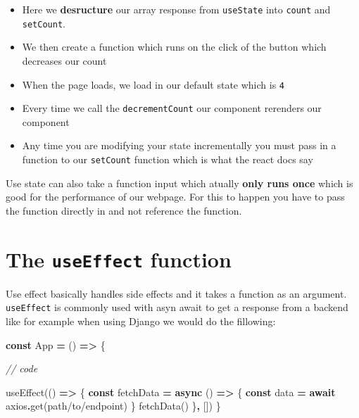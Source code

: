 \documentclass[
]{report}
\newenvironment{Shaded}{\begin{snugshade}}{\end{snugshade}}
\newcommand{\CommentTok}[1]{\textcolor[rgb]{0.56,0.35,0.01}{\textit{#1}}}
\newcommand{\ControlFlowTok}[1]{\textcolor[rgb]{0.13,0.29,0.53}{\textbf{#1}}}
\newcommand{\FunctionTok}[1]{\textcolor[rgb]{0.00,0.00,0.00}{#1}}
\newcommand{\KeywordTok}[1]{\textcolor[rgb]{0.13,0.29,0.53}{\textbf{#1}}}
\newcommand{\NormalTok}[1]{#1}
\newcommand{\OperatorTok}[1]{\textcolor[rgb]{0.81,0.36,0.00}{\textbf{#1}}}
\newcommand{\StringTok}[1]{\textcolor[rgb]{0.31,0.60,0.02}{#1}}
\providecommand{\tightlist}{%
  \setlength{\itemsep}{0pt}\setlength{\parskip}{0pt}}
\theoremstyle{definition}
\theoremstyle{definition}
\theoremstyle{definition}
\theoremstyle{definition}
\theoremstyle{remark}
\begin{document}
\begin{itemize}
\tightlist
\item
  Here we \textbf{desructure} our array response from \texttt{useState} into \texttt{count} and
  \texttt{setCount}.
\item
  We then create a function which runs on the click of the button which
  decreases our count
\item
  When the page loads, we load in our default state which is \texttt{4}
\item
  Every time we call the \texttt{decrementCount} our component rerenders our component
\item
  Any time you are modifying your state incrementally you must pass in a
  function to our \texttt{setCount} function which is what the react docs say
\end{itemize}

Use state can also take a function input which atually \textbf{only runs once} which
is good for the performance of our webpage. For this to happen you have to pass
the function directly in and not reference the function.

\hypertarget{the-useeffect-function}{%
\section{\texorpdfstring{The \texttt{useEffect} function}{The useEffect function}}\label{the-useeffect-function}}

Use effect basically handles side effects and it takes a function as an
argument. \texttt{useEffect} is commonly used with asyn await to get a response from a
backend like for example when using Django we would do the fillowing:

\begin{Shaded}
\begin{Highlighting}[]
\KeywordTok{const}\NormalTok{ App }\OperatorTok{=}\NormalTok{ () }\KeywordTok{=\textgreater{}}\NormalTok{ \{}

\CommentTok{// code}

    \FunctionTok{useEffect}\NormalTok{(() }\KeywordTok{=\textgreater{}}\NormalTok{ \{}
        \KeywordTok{const}\NormalTok{ fetchData }\OperatorTok{=} \KeywordTok{async}\NormalTok{ () }\KeywordTok{=\textgreater{}}\NormalTok{ \{}
            \KeywordTok{const}\NormalTok{ data }\OperatorTok{=} \ControlFlowTok{await}\NormalTok{ axios}\OperatorTok{.}\FunctionTok{get}\NormalTok{(}\StringTok{\textquotesingle{}path/to/endpoint\textquotesingle{}}\NormalTok{)}
\NormalTok{        \}}
        \FunctionTok{fetchData}\NormalTok{()}
\NormalTok{    \}}\OperatorTok{,}\NormalTok{ [])}
\NormalTok{\}}
\end{Highlighting}
\end{Shaded}
\end{document}
